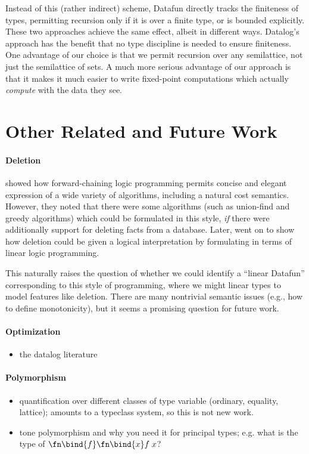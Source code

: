 Instead of this (rather indirect) scheme, Datafun directly tracks the
finiteness of types, permitting recursion only if it is over a finite
type, or is bounded explicitly. These two approaches achieve the same
effect, albeit in different ways. Datalog's approach has the benefit
that no type discipline is needed to ensure finiteness. One advantage
of our choice is that we permit recursion over any semilattice, not
just the semilattice of sets. A much more serious advantage of our
approach is that it makes it much easier to write fixed-point
computations which actually \emph{compute} with the data they see.



\section{Other Related and Future Work}
\label{sec:futurework}

\paragraph{Deletion} \citet{logical-algorithms} showed how
forward-chaining logic programming permits concise and elegant
expression of a wide variety of algorithms, including a natural cost
semantics. However, they noted that there were some algorithms (such
as union-find and greedy algorithms) which could be formulated in this
style, \emph{if} there were additionally support for deleting facts
from a database. Later, \citet{linear-logical-algorithms} went on to
show how deletion could be given a logical interpretation by
formulating in terms of linear logic programming.

This naturally raises the question of whether we could identify a
``linear Datafun'' corresponding to this style of programming, where
we might linear types to model features like deletion. There are many
nontrivial semantic issues (e.g., how to define monotonicity), but
it seems a promising question for future work.



\paragraph{Optimization}
\begin{itemize}
\item \TODO the datalog literature
\end{itemize}

\paragraph{Polymorphism}
\begin{itemize}
\item \TODO quantification over different classes of type variable (ordinary,
  equality, lattice); amounts to a typeclass system, so this is not new work.
\item \TODO tone polymorphism and why you need it for principal types; e.g.
  what is the type of $\fn\bind{f}\fn\bind{x} f\;x$?
\end{itemize}

